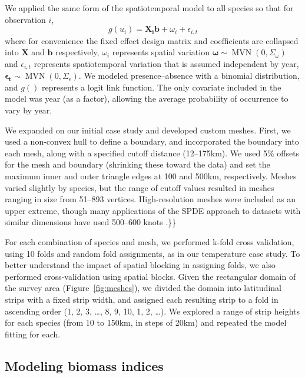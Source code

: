 \documentclass[11pt]{article}
\begin{document}
We applied the same form of the spatiotemporal model to all species so that for
observation \(i\), \[ g(u_{i}) = \mathbf{X_{i}}\mathbf{b}+ \omega_{i} +
\epsilon_{i,t} \] where for convenience the fixed effect design matrix and
coefficients are collapsed into \(\mathbf{X}\) and \(\mathbf{b}\) respectively,
\(\omega_{i}\) represents spatial variation \(\mathbf{\omega} \sim
\operatorname{MVN}(0,\Sigma_\omega)\) and \(\epsilon_{i,t}\) represents
spatiotemporal variation that is assumed independent by year,
\(\mathbf{\epsilon_{t}} \sim \operatorname{MVN}(0,\Sigma_\epsilon)\). We
modeled presence--absence with a binomial distribution, and \(g()\) represents
a logit link function. The only covariate included in the model was year (as a
factor), allowing the average probability of occurrence to vary by year.

We expanded on our initial case study and developed custom meshes. First, we
used a non-convex hull to define a boundary, and incorporated the boundary into
each mesh, along with a specified cutoff distance (12--175km). We used 5\%
offsets for the mesh and boundary (shrinking these toward the data) and set the
maximum inner and outer triangle edges at 100 and 500km, respectively. Meshes
varied slightly by species, but the range of cutoff values resulted in meshes
ranging in size from 51--893 vertices. High-resolution meshes were included as
an upper extreme, though many applications of the SPDE approach to datasets
with similar dimensions have used 500--600 knots
\citep[e.g.,][]{thorson2019,tolimieri_spatio-temporal_2020}.\}\}

For each combination of species and mesh, we performed k-fold cross validation,
using 10 folds and random fold assignments, as in our temperature case study.
To better understand the impact of spatial blocking in assigning folds, we also
performed cross-validation using spatial blocks. Given the rectangular domain
of the survey area (Figure~\ref{fig:meshes}), we divided the domain into
latitudinal strips with a fixed strip width, and assigned each resulting strip
to a fold in ascending order (1, 2, 3, \ldots, 8, 9, 10, 1, 2, \ldots). We
explored a range of strip heights for each species (from 10 to 150km, in steps
of 20km) and repeated the model fitting for each.

\subsection{Modeling biomass indices}
\end{document}
